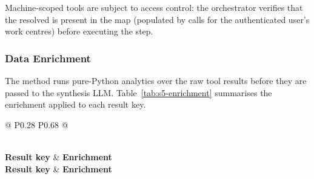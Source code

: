 Machine-scoped tools are subject to access control: the orchestrator verifies that
the resolved  is present in the  map
(populated by  calls for the authenticated user's work
centres) before executing the step.

\subsubsection*{Data Enrichment}

The  method runs pure-Python analytics over the
raw tool results before they are passed to the synthesis LLM. Table~\ref{tab:s5-enrichment}
summarises the enrichment applied to each result key.

\begin{longtable}{@{} P{0.28\linewidth} P{0.68\linewidth} @{}}
	\caption{Data Enrichment Applied per Result Key}
	\label{tab:s5-enrichment}\\
	\toprule
	\textbf{Result key} & \textbf{Enrichment} \\
	\midrule
	\endfirsthead
	\toprule
	\textbf{Result key} & \textbf{Enrichment} \\
	\midrule
	\endhead
	
	\bottomrule
	\endlastfoot


\end{longtable}
